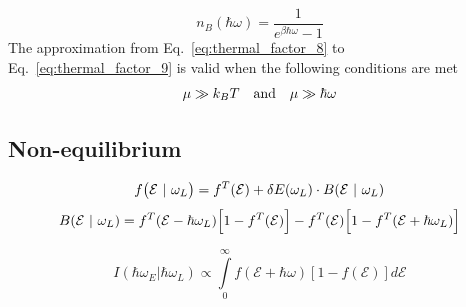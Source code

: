 \begin{equation}
n_{B}(\hbar\omega) = \frac{1}{e^{\beta \hbar\omega}-1}
\label{eq:thermal_factor_bose_einstein}
\end{equation}
The approximation from Eq.~\eqref{eq:thermal_factor_8} to Eq.~\eqref{eq:thermal_factor_9} is valid when the following conditions are met
\begin{equation}
\mu \gg k_{\small B}T \quad\text{and}\quad \mu\gg \hbar\omega
\label{eq:thermal_factor_conditions}
\end{equation}

\subsection{Non-equilibrium}

\begin{equation}
f\big( { \mathcal{E} \ | \ \omega _{\scriptsize L} }\big) = f^{T}({ \mathcal{E}}) + \delta E(\omega _{\scriptsize L})\cdot B({ \mathcal{E} \ | \ \omega _{\scriptsize L}}) 
\label{eq:thermal_factor_noneq_distribution}
\end{equation}
\begin{equation}
B({ \mathcal{E} \ |\ \omega _{\scriptsize L}}) = f^{T}({\mathcal{E} - \hbar\omega _{\scriptsize L}})\Big[ 1-f^{T}({\mathcal{E}}) \Big] - f^{T}(\mathcal{E})\Big[ 1- f^{T}(\mathcal{E}+\hbar\omega _{\scriptsize L}) \Big] 
\label{eq:thermal_factor_noneq_B_def}
\end{equation}

\begin{equation}
I(\hbar\omega_{E}|\hbar\omega_{L}) \propto \int\limits_{0}^{\infty} f(\mathcal{E}+\hbar\omega)[1-f(\mathcal{E})]d\mathcal{E}
\label{eq:thermal_factor_noneq_integral}
\end{equation}
